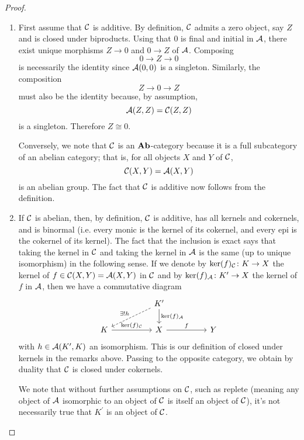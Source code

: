 \documentclass[reqno, 12pt]{amsart}
\begin{document}
\begin{proof}
  \noindent
  \begin{enumerate}
  \item
    First assume that $\mathcal{C}$ is additive.
    By definition, $\mathcal{C}$ admits a zero object, say $Z$ and is closed under biproducts.
    Using that 0 is final and initial in $\mathcal{A}$, there exist unique morphisms $Z \to 0$ and $0 \to Z$ of $\mathcal{A}$.
    Composing
    $$0 \to Z \to 0$$
    is necessarily the identity since $\mathcal{A}(0,0)$ is a singleton.
    Similarly, the composition
    $$Z \to 0 \to Z$$
    must also be the identity because, by assumption,
    $$\mathcal{A}(Z,Z) = \mathcal{C}(Z,Z)$$
    is a singleton.
    Therefore $Z \cong 0$.

    Conversely, we note that $\mathcal{C}$ is an $\operatorname{\bf Ab}$-category because it is a full subcategory of an abelian category; that is, for all objects $X$ and $Y$ of $\mathcal{C}$,
    $$\mathcal{C}(X,Y) = \mathcal{A}(X,Y)$$
    is an abelian group.
    The fact that $\mathcal{C}$ is additive now follows from the definition.

  \item
    If $\mathcal{C}$ is abelian, then, by definition, $\mathcal{C}$ is additive, has all kernels and cokernels, and is binormal (i.e. every monic is the kernel of its cokernel, and every epi is the cokernel of its kernel).
    The fact that the inclusion is exact says that taking the kernel in $\mathcal{C}$ and taking the kernel in $\mathcal{A}$ is the same (up to unique isomorphism) in the following sense.
    If we denote by $\operatorname{ker}(f)_{\mathcal{C}} \colon K \to X$ the kernel of $f \in \mathcal{C}(X,Y) = \mathcal{A}(X,Y)$ in $\mathcal{C}$ and by $\operatorname{ker}(f)_{\mathcal{A}} \colon K^\prime \to X$ the kernel of $f$ in $\mathcal{A}$, then we have a commutative diagram
    $$\begin{tikzcd}[column sep=huge]
      & K^\prime \arrow{d}{\op{ker}(f)_\A}\arrow[dashed,swap]{ld}{\exists !h}\\
      K \arrow{r}{\op{ker}(f)_\C} & X \arrow{r}{f} & Y
    \end{tikzcd}$$
    with $h \in \mathcal{A}(K^\prime, K)$ an isomorphism.
    This is our definition of closed under kernels in the remarks above.
    Passing to the opposite category, we obtain by duality that $\mathcal{C}$ is closed under cokernels.
    
    \begin{remark}
      We note that without further assumptions on $\mathcal{C}$, such as replete (meaning any object of $\mathcal{A}$ isomorphic to an object of $\mathcal{C}$ is itself an object of $\mathcal{C}$), it's not necessarily true that $K^\prime$ is an object of $\mathcal{C}$.
    \end{remark}


\end{enumerate}
\end{proof}
\end{document}
